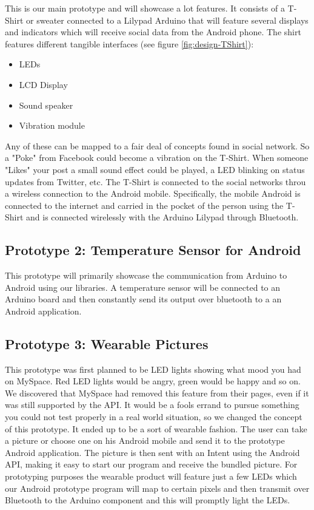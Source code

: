 This is our main prototype and will showcase a lot features.
It consists of a T-Shirt or sweater connected to a Lilypad Arduino that will feature
several displays and indicators which will receive social data from the Android phone.
The shirt features different tangible interfaces (see figure \ref{fig:design-TShirt}):
	
\begin{itemize}
\item LEDs
\item LCD Display
\item Sound speaker
\item Vibration module
\end{itemize}
	
Any of these can be mapped to a fair deal of concepts found in social network.
So a "Poke" from Facebook could become a vibration on the T-Shirt. When someone "Likes" your post a small sound effect
could be played, a LED blinking on status updates from Twitter, etc. The T-Shirt is connected to the social networks
throu a wireless connection to the Android mobile. Specifically, the mobile Android is connected to the internet
and carried in the pocket of the person using the T-Shirt and is connected wirelessly with the Arduino Lilypad through Bluetooth.
	

\newpage
	
\subsection{Prototype 2: Temperature Sensor for Android}
This prototype will primarily showcase the communication from Arduino to Android using our libraries.
A temperature sensor will be connected to an Arduino board and then constantly send its output over bluetooth to a
an Android application.
	
\subsection{Prototype 3: Wearable Pictures}
This prototype was first planned to be LED lights showing what mood you had on MySpace. Red LED lights would be angry,
green would be happy and so on. We discovered that MySpace had removed this feature from their pages, even if it was
still supported by the API. It would be a fools errand to pursue something you could not test properly
in a real world situation, so we changed the concept of this prototype. It ended up to be a sort of wearable fashion.
The user can take a picture or choose one on his Android mobile and send it to the prototype Android application.
The picture is then sent with an Intent using the Android API, making it easy to start our program and receive
the bundled picture. For prototyping purposes the wearable product will feature just a few LEDs which our Android
prototype program will map to certain pixels and then transmit over Bluetooth to the Arduino
component and this will promptly light the LEDs.


